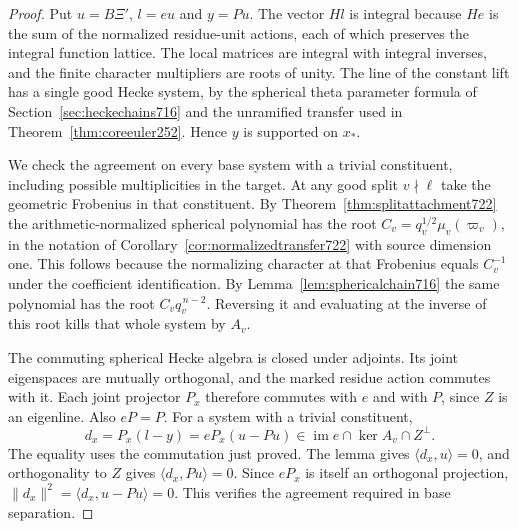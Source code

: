 \documentclass[a4paper,11pt]{article}
\theoremstyle{definition}
\theoremstyle{remark}
\numberwithin{equation}{section}
\begin{document}
\begin{proof}
Put \(u=B\Xi'\), \(l=eu\) and \(y=Pu\). The vector \(Hl\)
is integral because \(He\) is the sum of the normalized residue-unit
actions, each of which preserves the integral function lattice.
The local matrices are integral with integral inverses, and the
finite character multipliers are roots of unity. The line of the
constant lift has a single good Hecke system, by the spherical
theta parameter formula of Section~\ref{sec:heckechains716}
and the unramified transfer used in Theorem~\ref{thm:coreeuler252}.
Hence \(y\) is supported on \(x_*\).

We check the agreement on every base system with a trivial
constituent, including possible multiplicities in the target.
At any good split \(v\nmid\ell\) take the geometric Frobenius
in that constituent. By Theorem~\ref{thm:splitattachment722}
the arithmetic-normalized spherical polynomial has the root
\(C_v=q_v^{1/2}\mu_v(\varpi_v)\), in the notation of
Corollary~\ref{cor:normalizedtransfer722} with source dimension
one. This follows because the normalizing character at that
Frobenius equals \(C_v^{-1}\) under the coefficient
identification. By Lemma~\ref{lem:sphericalchain716} the same
polynomial has the root \(C_v q_v^{\,n-2}\). Reversing it and
evaluating at the inverse of this root kills that whole system
by \(A_v\).

The commuting spherical Hecke algebra is closed under adjoints.
Its joint eigenspaces are mutually orthogonal, and the marked
residue action commutes with it. Each joint projector \(P_x\)
therefore commutes with \(e\) and with \(P\), since \(Z\) is an
eigenline. Also \(eP=P\). For a system with a trivial constituent,
\[
       d_x=P_x(l-y)=eP_x(u-Pu)
               \in\operatorname{im}e\cap\ker A_v\cap Z^\perp .
\]
The equality uses the commutation just proved. The lemma gives
\(\langle d_x,u\rangle=0\), and orthogonality to \(Z\) gives
\(\langle d_x,Pu\rangle=0\). Since \(eP_x\) is itself an
orthogonal projection, \(\|d_x\|^2=\langle d_x,u-Pu\rangle=0\).
This verifies the agreement required in base separation.


\end{proof}
\end{document}
